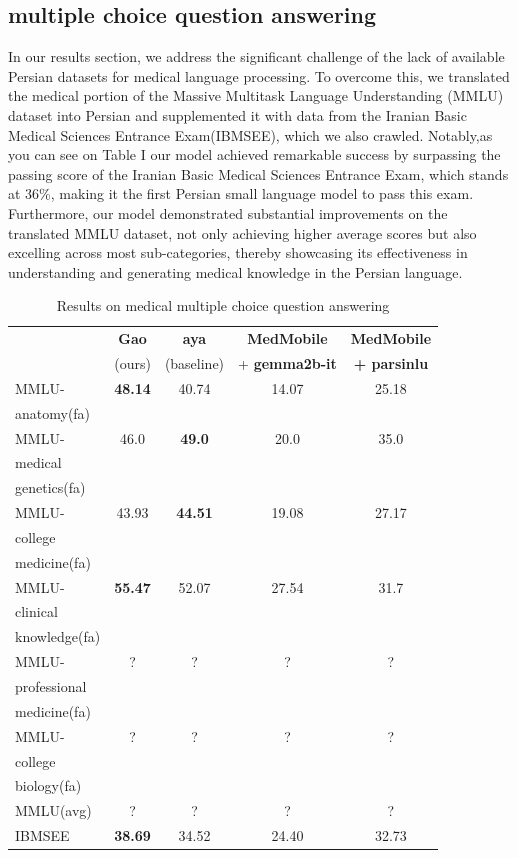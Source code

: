 \documentclass[conference]{IEEEtran}
\begin{document}
\subsection{multiple choice question answering}
In our results section, we address the significant challenge of the lack of available Persian datasets for medical language processing. To overcome this, we translated the medical portion of the Massive Multitask Language Understanding (MMLU)
\cite{b17}
dataset into Persian and supplemented it with data from the Iranian Basic Medical Sciences Entrance Exam(IBMSEE), which we also crawled. Notably,as you can see on Table I our model achieved remarkable success by surpassing the passing score of the Iranian Basic Medical Sciences Entrance Exam, which stands at 36\%, making it the first Persian small language model to pass this exam. Furthermore, our model demonstrated substantial improvements on the translated MMLU dataset, not only achieving higher average scores but also excelling across most sub-categories, thereby showcasing its effectiveness in understanding and generating medical knowledge in the Persian language.
\begin{table}[ht]
	\centering
	\caption{Results on medical multiple choice question answering}
	\begin{tabular}{|l|c|c|c|c|}  %
		\hline
		\textbf{} & \textbf{Gao} & \textbf{aya}
		 & \textbf{MedMobile} & \textbf{MedMobile} \\ 
		 & (ours) & (baseline) & + \textbf{gemma2b-it} & \textbf{+ parsinlu} \\ \hline
		MMLU- & \textbf{48.14} & 40.74 & 14.07 & 25.18 \\ 
		anatomy(fa) &  &  &  &  \\ \hline
		MMLU- & 46.0 & \textbf{49.0} & 20.0 & 35.0 \\
		medical &  &  &  &  \\ 
		genetics(fa) &  &  &  &  \\ \hline
		MMLU- & 43.93 & \textbf{44.51} & 19.08 & 27.17 \\
		college &  &  &  &  \\
		medicine(fa) &  &  &  &  \\ \hline
		MMLU- & \textbf{55.47} & 52.07 & 27.54 & 31.7 \\
		clinical&  &  &  &  \\
		knowledge(fa)&  &  &  &  \\ \hline
		MMLU- & ? & ? & ? & ? \\
        professional&  &  &  &  \\ 
        medicine(fa)&  &  &  &  \\ \hline
        MMLU- & ? & ? & ? & ? \\
        college&  &  &  &  \\
        biology(fa)&  &  &  &  \\ \hline
        MMLU(avg) & ? & ? & ? & ? \\ \hline
		IBMSEE & \textbf{38.69} & 34.52 & 24.40 & 32.73 \\ 
        \hline
	\end{tabular}
	\label{tab:model_results}
\end{table}
\end{document}
